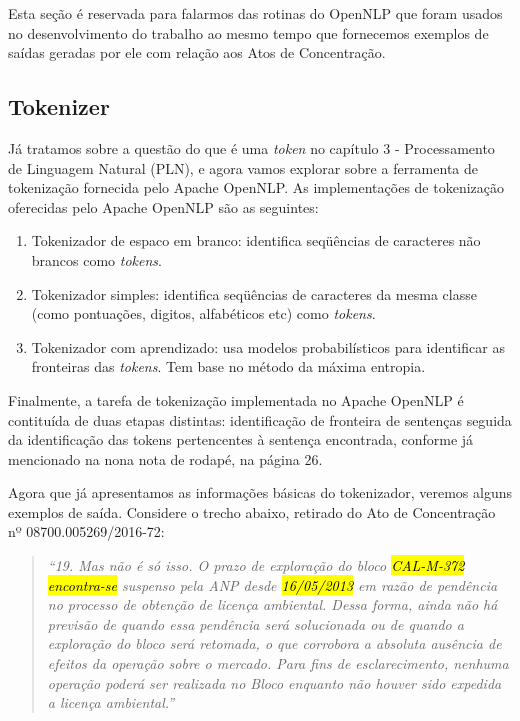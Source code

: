 \documentclass[11pt]{report}
\newcommand{\quotes}[1]{``#1''}
\begin{document}
Esta seção é reservada para falarmos das rotinas do OpenNLP que foram usados no desenvolvimento do trabalho
ao mesmo tempo que fornecemos exemplos de saídas geradas por ele com relação aos Atos de Concentração.


\subsection{Tokenizer}

\indent\indent Já tratamos sobre a questão do que é uma \textit{token} no capítulo 3 - Processamento de Linguagem Natural (PLN), e agora vamos explorar sobre a ferramenta de
tokenização fornecida pelo Apache OpenNLP. As implementações de tokenização oferecidas pelo Apache OpenNLP são as seguintes:

\begin{enumerate}[label=\textbf{{\Roman*.}}]
  \item Tokenizador de espaco em branco: identifica seqüências de caracteres não brancos como \textit{tokens}.
  \item Tokenizador simples: identifica seqüências de caracteres da mesma classe (como pontuações, digitos, alfabéticos etc) como \textit{tokens}.
  \item Tokenizador com aprendizado: usa modelos probabilísticos para identificar as fronteiras das \textit{tokens}. Tem base no método da máxima entropia.
\end{enumerate}

Finalmente, a tarefa de tokenização implementada no Apache OpenNLP é contituída de duas etapas distintas: identificação de fronteira de sentenças seguida da identificação das
tokens pertencentes à sentença encontrada, conforme já mencionado na nona nota de rodapé, na página 26.

Agora que já apresentamos as informações básicas do tokenizador, veremos alguns exemplos de saída. Considere o trecho abaixo, retirado do Ato de Concentração nº 08700.005269/2016-72:

\begin{quote}
  \textit{\quotes{19. Mas não é só isso. O prazo de exploração do bloco \hl{CAL-M-372} \hl{encontra-se} suspenso pela ANP desde \hl{16/05/2013} em razão de pendência no processo de obtenção de licença ambiental. Dessa forma, ainda não há previsão de quando essa pendência será solucionada ou de quando a exploração do bloco será retomada, o que corrobora a absoluta ausência de efeitos da operação sobre o mercado. Para fins de esclarecimento, nenhuma operação poderá ser realizada no Bloco enquanto não houver sido expedida a licença ambiental.}}
\end{quote}
\end{document}
